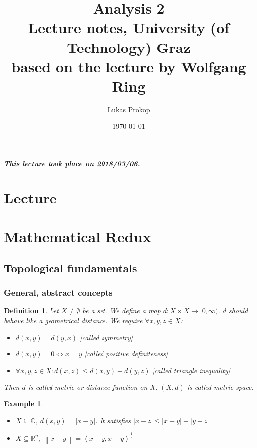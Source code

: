 \documentclass{article}
\title{
  Analysis 2 \\
  \large{Lecture notes, University (of Technology) Graz} \\
  based on the lecture by Wolfgang Ring
}
\date{\today}
\author{Lukas Prokop}
\newtheorem{example}{Example}  \numberwithin{example}{section}
\newtheorem{definition}{Definition}  \numberwithin{definition}{section}
\newcommand{\angel}[1]{\left\langle#1\right\rangle}
\newcommand{\norm}[1]{\left\|#1\right\|}
\newcommand{\card}[1]{\left|#1\right|}
\newcommand{\dateref}[1]{\paragraph{\textit{This lecture took place on #1.}}}
\begin{document}
\maketitle
\tableofcontents

\dateref{2018/03/06}

\section{Lecture}

\section{Mathematical Redux}
\subsection{Topological fundamentals}
\subsubsection{General, abstract concepts}

\begin{definition}
  Let $X \neq \emptyset$ be a set. We define a map $d: X \times X \to [0,\infty)$.
  $d$ should behave like a geometrical distance. We require $\forall x, y, z \in X$:
  \begin{itemize}
    \item $d(x, y) = d(y, x)$ [called \emph{symmetry}]
    \item $d(x, y) = 0 \iff x = y$ [called \emph{positive definiteness}]
    \item $\forall x,y,z \in X: d(x, z) \leq d(x, y) + d(y, z)$ [called \emph{triangle inequality}]
  \end{itemize}
  Then $d$ is called \emph{metric} or \emph{distance function} on $X$.
  $(X, d)$ is called \emph{metric space}.
\end{definition}

\begin{example}
  \begin{itemize}\hfill{}
    \item $X \subseteq \mathbb C$, $d(x, y) = \card{x - y}$.
          It satisfies $\card{x - z} \leq \card{x - y} + \card{y - z}$
    \item $X \subseteq \mathbb R^n$, $\norm{x - y} = \angel{x - y, x - y}^{\frac12}$
  \end{itemize}
\end{example}
\end{document}
